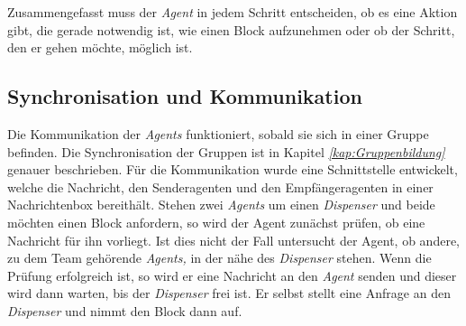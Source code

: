 Zusammengefasst muss der \textit{Agent} in jedem Schritt entscheiden, ob es eine Aktion gibt, die gerade notwendig ist, wie einen Block aufzunehmen oder ob der Schritt, den er gehen möchte, möglich ist.  

\subsection{Synchronisation und Kommunikation} \label{kap:kommunikation}
Die Kommunikation der \textit{Agents} funktioniert, sobald sie sich in einer Gruppe befinden. Die Synchronisation der Gruppen ist in Kapitel \textit{\ref{kap:Gruppenbildung}} genauer beschrieben. Für die Kommunikation wurde eine Schnittstelle entwickelt, welche die Nachricht, den Senderagenten und den Empfängeragenten in einer Nachrichtenbox bereithält. Stehen zwei \textit{Agents} um einen \textit{Dispenser} und beide möchten einen Block anfordern, so wird der Agent zunächst prüfen, ob eine Nachricht für ihn vorliegt. Ist dies nicht der Fall untersucht der Agent, ob andere, zu dem Team gehörende \textit{Agents,} in der nähe des \textit{Dispenser} stehen. Wenn die Prüfung erfolgreich ist, so wird er eine Nachricht an den \textit{Agent} senden und dieser wird dann warten, bis der \textit{Dispenser} frei ist. Er selbst stellt eine Anfrage an den \textit{Dispenser} und nimmt den Block dann auf.
